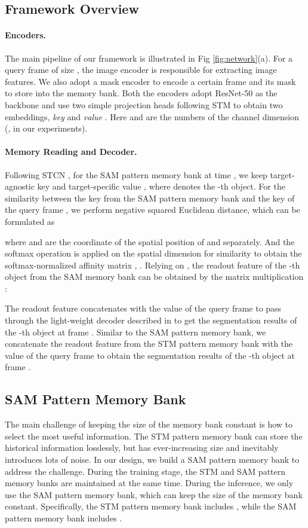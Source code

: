 \documentclass[10pt,twocolumn,letterpaper]{article}
\begin{document}
\subsection{Framework Overview}
\paragraph{Encoders.}
The main pipeline of our framework is illustrated in Fig \ref{fig:network}(a). For a query frame of size , the image encoder  is responsible for extracting image features. We also adopt a mask encoder  to encode a certain frame and its mask to store into the memory bank. Both the encoders adopt ResNet-50 \cite{he2016deep} as the backbone and use two simple projection heads following STM \cite{oh2019video} to obtain two embeddings, \textit{key}  and \textit{value} . Here  and  are the numbers of the channel dimension (,  in our experiments). 

\vspace{-0.5em}
\paragraph{Memory Reading and Decoder.}
Following STCN \cite{cheng2021rethinking}, for the SAM pattern memory bank  at time ,  we keep target-agnostic key  and target-specific value , where  denotes the -th object. For the similarity  between the key from the SAM pattern memory bank  and the key of the query frame , we perform negative squared Euclidean distance, which can be formulated as 

where  and  are the coordinate of the spatial
position of  and  separately. And the softmax operation is applied on the spatial dimension for similarity  to obtain the  softmax-normalized affinity matrix , . Relying on , the readout feature  of the -th object from the SAM memory bank can be obtained by the matrix multiplication : 

The readout feature  concatenates with the value of the query frame to pass through the light-weight decoder described in \cite{cheng2021rethinking} to get the segmentation results  of the -th object at frame . Similar to the SAM pattern memory bank, we concatenate the readout feature  from the STM pattern memory bank  with the value of the query frame to obtain the segmentation results  of the -th object at frame .






\subsection{SAM Pattern Memory Bank}
The main challenge of keeping the size of the memory bank constant is how to select the most useful information. The STM pattern memory bank can store the historical information losslessly, but has ever-increasing size and inevitably introduces lots of noise. In our design, we build a SAM pattern memory bank to address the challenge. During the training stage, the STM and SAM pattern memory banks are maintained at the same time. During the inference, we only use the SAM pattern memory bank, which can keep the size of the memory bank constant. Specifically, the STM pattern memory bank  includes , while the SAM pattern memory bank  includes .  
\end{document}
